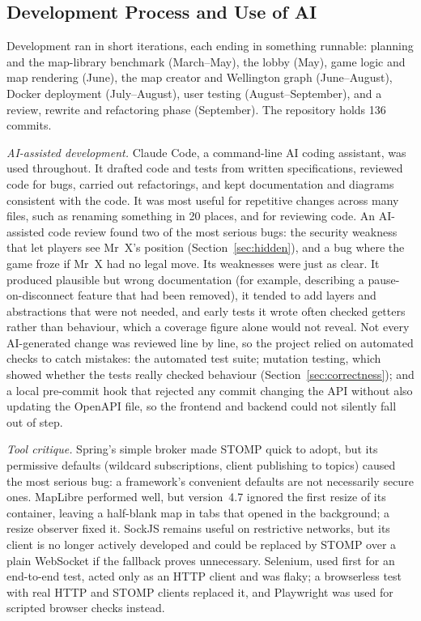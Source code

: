 \documentclass[lettersize,journal]{IEEEtran}
\begin{document}
\subsection{Development Process and Use of AI}\label{sec:process}
Development ran in short iterations, each ending in something runnable: planning and the map-library benchmark (March--May), the lobby (May), game logic and map rendering (June), the map creator and Wellington graph (June--August), Docker deployment (July--August), user testing (August--September), and a review, rewrite and refactoring phase (September). The repository holds 136 commits.

\emph{AI-assisted development.} Claude Code, a command-line AI coding assistant, was used throughout. It drafted code and tests from written specifications, reviewed code for bugs, carried out refactorings, and kept documentation and diagrams consistent with the code. It was most useful for repetitive changes across many files, such as renaming something in 20 places, and for reviewing code. An AI-assisted code review found two of the most serious bugs: the security weakness that let players see Mr~X's position (Section~\ref{sec:hidden}), and a bug where the game froze if Mr~X had no legal move. Its weaknesses were just as clear. It produced plausible but wrong documentation (for example, describing a pause-on-disconnect feature that had been removed), it tended to add layers and abstractions that were not needed, and early tests it wrote often checked getters rather than behaviour, which a coverage figure alone would not reveal. Not every AI-generated change was reviewed line by line, so the project relied on automated checks to catch mistakes: the automated test suite; mutation testing, which showed whether the tests really checked behaviour (Section~\ref{sec:correctness}); and a local pre-commit hook that rejected any commit changing the API without also updating the OpenAPI file, so the frontend and backend could not silently fall out of step.

\emph{Tool critique.} Spring's simple broker made STOMP quick to adopt, but its permissive defaults (wildcard subscriptions, client publishing to topics) caused the most serious bug: a framework's convenient defaults are not necessarily secure ones. MapLibre performed well, but version~4.7 ignored the first resize of its container, leaving a half-blank map in tabs that opened in the background; a resize observer fixed it. SockJS remains useful on restrictive networks, but its client is no longer actively developed and could be replaced by STOMP over a plain WebSocket if the fallback proves unnecessary. Selenium, used first for an end-to-end test, acted only as an HTTP client and was flaky; a browserless test with real HTTP and STOMP clients replaced it, and Playwright was used for scripted browser checks instead.
\end{document}
